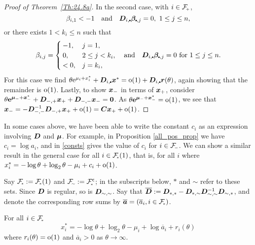 \begin{proof} [Proof of Theorem~{\rm \ref{Th:24.8a}}]
In the second case, with $i\in \Fset{+}$,
\[
 \beta_{i,1}<-1 \quad \text{and} \quad
 \bfD_{i,\sbullet}  \bfbeta_{\sbullet,j}=0,\ 1 \leq j \leq n,
\]
or there exists
$1 < k_i \leq n$ such that
\[ \beta_{i,j} = \begin{cases}
	-1, & j = 1, \\
	0, & 2 \le j < k_i, \\
	< 0, & j = k_i,
\end{cases} \quad \text{and} \quad
	\bfD_{i,\sbullet}  \bfbeta_{\sbullet,j}=0 \text{ for } 1 \le j \le n.
\]
For this case we find
$ \theta \e^{\mu_i+x_i^*}+\bfD_{i,\sbullet}  \bfx^*=
 \oh(1)+\bfD_{i,\sbullet}  \bfr(\theta)$,
again showing that the remainder is ${\mathrm{o}}(1)$. Lastly, to show $\bm{x}_{-}$ in
terms of $\bm{x}_{+}$, consider $\theta \text{\bf{e}}^{\bm{\mu}_{-} + \bm{x}_{-}^*} +
\bm{D}_{{-},{+}} \bm{x}_{+} + \bm{D}_{{-},{-}} \bm{x}_{-} = \bm{0}$. As $\theta
\text{\bf{e}}^{\bm{\mu}_{-} + \bm{x}_{-}^*} = {\mathrm{o}}(1)$, we see that $\bm{x}_{-} =
-\bm{D}_{{-},{-}}^{-1} \bm{D}_{{-},{+}} \bm{x}_{+} + {\mathrm{o}}(1)= \bm{C} \bm{x}_{+} +
{\mathrm{o}}(1)$.
\end{proof}

In some cases above, we have been able to write the constant $c_i$ as an
expression involving $\bm{D}$ and $\bm{\mu}$. For example, in Proposition
\ref{all_pos_prop} we have $c_i = \log a_i$, and in 
\eqref{consts} gives the value of $c_i$ for $i \in \Fset{-}$. We can show a
similar result in the general case for all $i \in \Fset{*}(1)$, that is, for
all $i$ where $x_i^* = -\log \theta + \log_2 \theta - \mu_i + c_i + {\mathrm{o}}(1)$.

Say $\Fset{*} \defeq \Fset{*}(1)$ and $\Fset{\sim} \defeq \Fset{*}^\comp$; in
the subscripts below, $*$ and $\sim$ refer to these sets. Since $\bm{D}$ is
regular, so is $\bm{D}_{{\sim},{\sim}}$. Say that $\overline{\bm{D}} :=
\bm{D}_{{*},{*}}-\bm{D}_{{*},{\sim}}\bm{D}_{{\sim},{\sim}}^{-1}\bm{D}_{{\sim},{*}}$,
and denote the corresponding row sums by $\overline{\bfa} = (\overline{a}_i, i
\in \Fset{*})$.

\begin{corollary}\label{Cor:24.8d}
For all $i \in \Fset{*}$
\[
    x_i^* = {-}\log \theta + \log_2 \theta - \mu_i + \log \overline{a}_i + r_i(\theta)
\]
where $r_i(\theta) = {\mathrm{o}}(1)$ and $\overline{a}_i > 0$ as $\theta \to \infty$.
\end{corollary}

